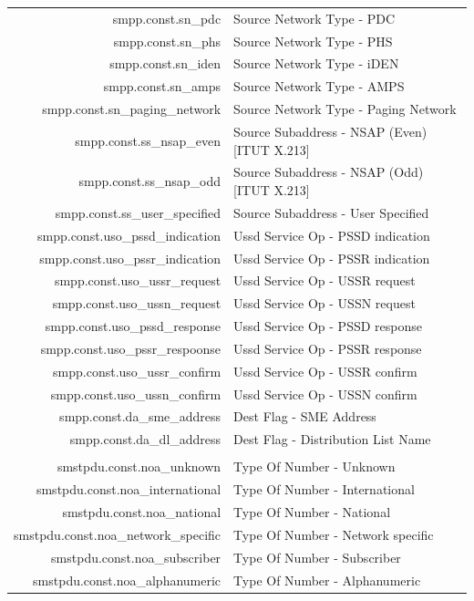 \documentclass[a4paper,latin]{paper}
\begin{document}
\begin{tabularx}{\linewidth}{ | >{\ttfamily} r | >{\ttfamily} X |}
	smpp.const.sn\_pdc				& Source Network Type - PDC\\
	smpp.const.sn\_phs				& Source Network Type - PHS\\
	smpp.const.sn\_iden				& Source Network Type - iDEN\\
	smpp.const.sn\_amps				& Source Network Type - AMPS\\
	smpp.const.sn\_paging\_network			& Source Network Type - Paging Network\\
	smpp.const.ss\_nsap\_even			& Source Subaddress - NSAP (Even) [ITUT X.213]\\
	smpp.const.ss\_nsap\_odd			& Source Subaddress - NSAP (Odd) [ITUT X.213]\\
	smpp.const.ss\_user\_specified			& Source Subaddress - User Specified\\
	smpp.const.uso\_pssd\_indication		& Ussd Service Op - PSSD indication\\
	smpp.const.uso\_pssr\_indication		& Ussd Service Op - PSSR indication\\
	smpp.const.uso\_ussr\_request			& Ussd Service Op - USSR request\\
	smpp.const.uso\_ussn\_request			& Ussd Service Op - USSN request\\
	smpp.const.uso\_pssd\_response			& Ussd Service Op - PSSD response\\
	smpp.const.uso\_pssr\_respoonse			& Ussd Service Op - PSSR response\\
	smpp.const.uso\_ussr\_confirm			& Ussd Service Op - USSR confirm\\
	smpp.const.uso\_ussn\_confirm			& Ussd Service Op - USSN confirm\\
	smpp.const.da\_sme\_address			& Dest Flag - SME Address\\
	smpp.const.da\_dl\_address			& Dest Flag - Distribution List Name\\
	\hline
	\rowcolor{blue!10}
	\multicolumn{2}{| l |}{\acrfull{smstpdu}} 	\\
	\hline
	smstpdu.const.noa\_unknown			& Type Of Number - Unknown\\
	smstpdu.const.noa\_international		& Type Of Number - International\\
	smstpdu.const.noa\_national			& Type Of Number - National\\
	smstpdu.const.noa\_network\_specific		& Type Of Number - Network specific\\
	smstpdu.const.noa\_subscriber			& Type Of Number - Subscriber\\
	smstpdu.const.noa\_alphanumeric			& Type Of Number - Alphanumeric\\

\end{tabularx}
\end{document}
